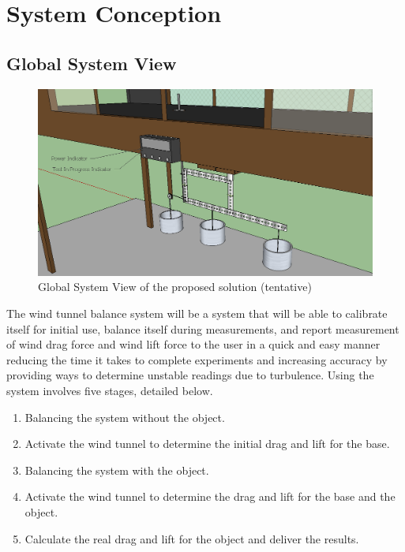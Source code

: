 \section{System Conception}
	\subsection{Global System View}

		\begin{figure}[H]
			\centering
				\includegraphics[scale=0.40]{img/globalview}
			\caption{Global System View of the proposed solution (tentative)}
		\end{figure}

		The wind tunnel balance system will be a system that will be able to calibrate itself for initial use, balance itself during measurements, and report measurement of wind drag force and wind lift force to the user in a quick and easy manner reducing the time it takes to complete experiments and increasing accuracy by providing ways to determine unstable readings due to turbulence. Using the system involves five stages, detailed below.
		
		\begin{enumerate}
			\item Balancing the system without the object.
			\item Activate the wind tunnel to determine the initial drag and lift for the base.
			\item Balancing the system with the object.
			\item Activate the wind tunnel to determine the drag and lift for the base and the object.
			\item Calculate the real drag and lift for the object and deliver the results.
		\end{enumerate}


